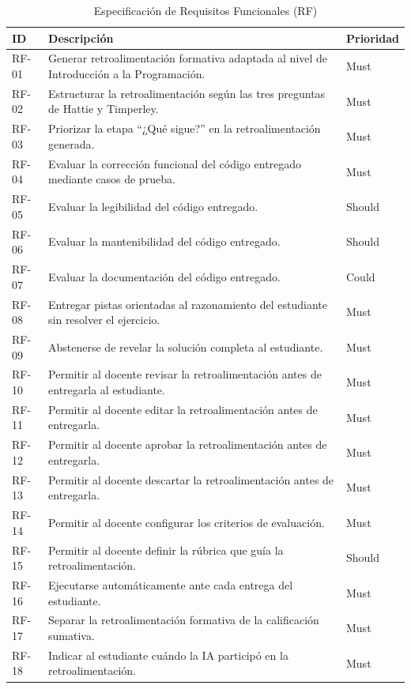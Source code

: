 \documentclass[letterpaper, 10 pt, conference]{ieeeconf}
\begin{document}
\begin{table}[ht]
	\centering
	\caption{Especificación de Requisitos Funcionales (RF)}
	\label{tab:req_funcional}
	\begin{tabular}{lp{5.0cm}l}
		\hline
		\textbf{ID} & \textbf{Descripción} & \textbf{Prioridad} \\
		\hline
		RF-01 & Generar retroalimentación formativa adaptada al nivel de Introducción a la Programación. & Must \\
		RF-02 & Estructurar la retroalimentación según las tres preguntas de Hattie y Timperley. & Must \\
		RF-03 & Priorizar la etapa “¿Qué sigue?” en la retroalimentación generada. & Must \\
		RF-04 & Evaluar la corrección funcional del código entregado mediante casos de prueba. & Must \\
		RF-05 & Evaluar la legibilidad del código entregado. & Should \\
		RF-06 & Evaluar la mantenibilidad del código entregado. & Should \\
		RF-07 & Evaluar la documentación del código entregado. & Could \\
		RF-08 & Entregar pistas orientadas al razonamiento del estudiante sin resolver el ejercicio. & Must \\
		RF-09 & Abstenerse de revelar la solución completa al estudiante. & Must \\
		RF-10 & Permitir al docente revisar la retroalimentación antes de entregarla al estudiante. & Must \\
		RF-11 & Permitir al docente editar la retroalimentación antes de entregarla. & Must \\
		RF-12 & Permitir al docente aprobar la retroalimentación antes de entregarla. & Must \\
		RF-13 & Permitir al docente descartar la retroalimentación antes de entregarla. & Must \\
		RF-14 & Permitir al docente configurar los criterios de evaluación. & Must \\
		RF-15 & Permitir al docente definir la rúbrica que guía la retroalimentación. & Should \\
		RF-16 & Ejecutarse automáticamente ante cada entrega del estudiante. & Must \\
		RF-17 & Separar la retroalimentación formativa de la calificación sumativa. & Must \\
		RF-18 & Indicar al estudiante cuándo la IA participó en la retroalimentación. & Must \\

\end{tabular}
\end{table}
\end{document}
